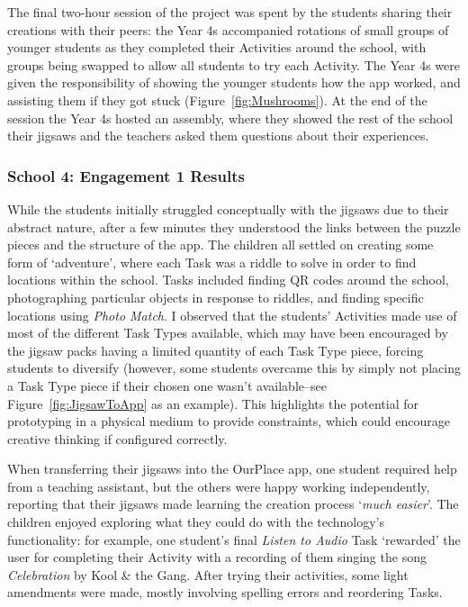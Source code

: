 The final two-hour session of the project was spent by the students sharing their creations with their peers: the Year 4s accompanied rotations of small groups of younger students as they completed their Activities around the school, with groups being swapped to allow all students to try each Activity. The Year 4s were given the responsibility of showing the younger students how the app worked, and assisting them if they got stuck (Figure~\ref{fig:Mushrooms}). At the end of the session the Year 4s hosted an assembly, where they showed the rest of the school their jigsaws and the teachers asked them questions about their experiences.

\subsubsection{School 4: Engagement 1 Results}
While the students initially struggled conceptually with the jigsaws due to their abstract nature, after a few minutes they understood the links between the puzzle pieces and the structure of the app. The children all settled on creating some form of `adventure', where each Task was a riddle to solve in order to find locations within the school. Tasks included finding QR codes around the school, photographing particular objects in response to riddles, and finding specific locations using \textit{Photo Match}. I observed that the students' Activities made use of most of the different Task Types available, which may have been encouraged by the jigsaw packs having a limited quantity of each Task Type piece, forcing students to diversify (however, some students overcame this by simply not placing a Task Type piece if their chosen one wasn't available--see Figure~\ref{fig:JigsawToApp} as an example). This highlights the potential for prototyping in a physical medium to provide constraints, which could encourage creative thinking if configured correctly.

When transferring their jigsaws into the OurPlace app, one student required help from a teaching assistant, but the others were happy working independently, reporting that their jigsaws made learning the creation process `\textit{much easier}'. The children enjoyed exploring what they could do with the technology's functionality: for example, one student's final \textit{Listen to Audio} Task `rewarded' the user for completing their Activity with a recording of them singing the song \textit{Celebration} by Kool \& the Gang. After trying their activities, some light amendments were made, mostly involving spelling errors and reordering Tasks. 

